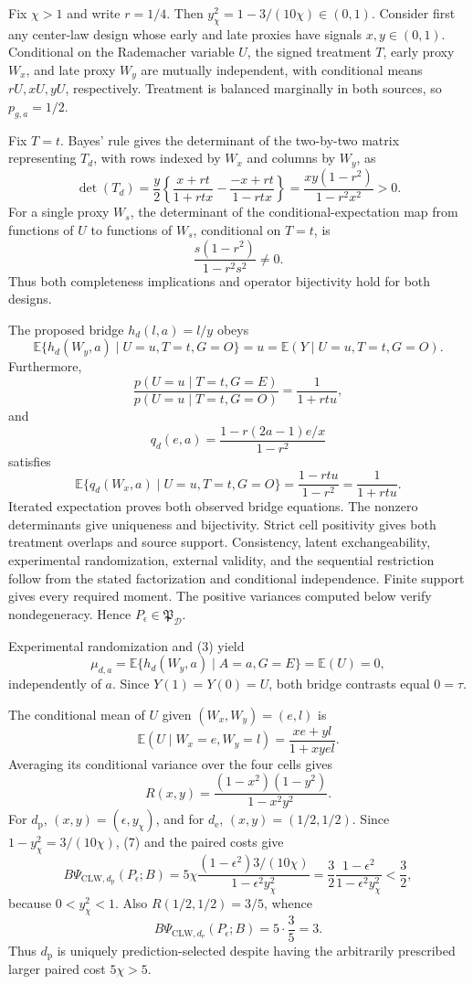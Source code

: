 Fix \(\chi>1\) and write \(r=1/4\). Then \(y_\chi^2=1-3/(10\chi)\in(0,1)\). Consider first any center-law design whose early and late proxies have signals \(x,y\in(0,1)\). Conditional on the Rademacher variable \(U\), the signed treatment \(T\), early proxy \(W_x\), and late proxy \(W_y\) are mutually independent, with conditional means \(rU,xU,yU\), respectively. Treatment is balanced marginally in both sources, so \(p_{g,a}=1/2\).

Fix \(T=t\). Bayes' rule gives the determinant of the two-by-two matrix representing \(T_d\), with rows indexed by \(W_x\) and columns by \(W_y\), as
\[
 \det(T_d)
 =\frac y2\left\{
 \frac{x+rt}{1+rtx}-\frac{-x+rt}{1-rtx}\right\}
 =\frac{xy(1-r^2)}{1-r^2x^2}>0. \tag{1}
\]
For a single proxy \(W_s\), the determinant of the conditional-expectation map from functions of \(U\) to functions of \(W_s\), conditional on \(T=t\), is
\[
 \frac{s(1-r^2)}{1-r^2s^2}\ne0. \tag{2}
\]
Thus both completeness implications and operator bijectivity hold for both designs.

The proposed bridge \(h_d(l,a)=l/y\) obeys
\[
 \mathbb E\{h_d(W_y,a)\mid U=u,T=t,G=O\}=u
 =\mathbb E(Y\mid U=u,T=t,G=O). \tag{3}
\]
Furthermore,
\[
 \frac{p(U=u\mid T=t,G=E)}{p(U=u\mid T=t,G=O)}
 =\frac1{1+rtu}, \tag{4}
\]
and
\[
 q_d(e,a)=\frac{1-r(2a-1)e/x}{1-r^2}
\]
satisfies
\[
 \mathbb E\{q_d(W_x,a)\mid U=u,T=t,G=O\}
 =\frac{1-rtu}{1-r^2}=\frac1{1+rtu}. \tag{5}
\]
Iterated expectation proves both observed bridge equations. The nonzero determinants give uniqueness and bijectivity. Strict cell positivity gives both treatment overlaps and source support. Consistency, latent exchangeability, experimental randomization, external validity, and the sequential restriction follow from the stated factorization and conditional independence. Finite support gives every required moment. The positive variances computed below verify nondegeneracy. Hence \(P_\epsilon\in\mathfrak P_{\mathcal D}\).

Experimental randomization and (3) yield
\[
 \mu_{d,a}=\mathbb E\{h_d(W_y,a)\mid A=a,G=E\}=\mathbb E(U)=0, \tag{6}
\]
independently of \(a\). Since \(Y(1)=Y(0)=U\), both bridge contrasts equal \(0=\tau\).

The conditional mean of \(U\) given \((W_x,W_y)=(e,l)\) is
\[
 \mathbb E(U\mid W_x=e,W_y=l)=\frac{xe+yl}{1+xyel}.
\]
Averaging its conditional variance over the four cells gives
\[
 R(x,y)=\frac{(1-x^2)(1-y^2)}{1-x^2y^2}. \tag{7}
\]
For \(d_{\mathrm p}\), \((x,y)=(\epsilon,y_\chi)\), and for \(d_{\mathrm e}\), \((x,y)=(1/2,1/2)\). Since \(1-y_\chi^2=3/(10\chi)\), (7) and the paired costs give
\[
 B\Psi_{\mathrm{CLW},d_{\mathrm p}}(P_\epsilon;B)
 =5\chi\frac{(1-\epsilon^2)3/(10\chi)}
 {1-\epsilon^2y_\chi^2}
 =\frac32\frac{1-\epsilon^2}{1-\epsilon^2y_\chi^2}
 <\frac32, \tag{8}
\]
because \(0<y_\chi^2<1\). Also \(R(1/2,1/2)=3/5\), whence
\[
 B\Psi_{\mathrm{CLW},d_{\mathrm e}}(P_\epsilon;B)=5\cdot\frac35=3. \tag{9}
\]
Thus \(d_{\mathrm p}\) is uniquely prediction-selected despite having the arbitrarily prescribed larger paired cost \(5\chi>5\).


